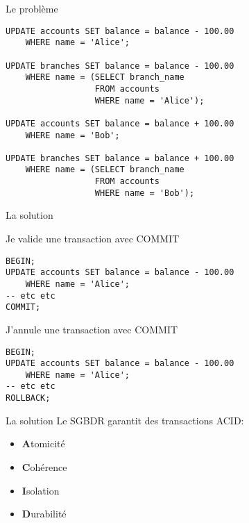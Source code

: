 \documentclass[xetex,dvipsnames]{beamer}
\begin{document}
\begin{frame}[fragile]{Le problème}
	\begin{verbatim}
UPDATE accounts SET balance = balance - 100.00
    WHERE name = 'Alice';
    
UPDATE branches SET balance = balance - 100.00
    WHERE name = (SELECT branch_name 
                  FROM accounts 
                  WHERE name = 'Alice');
                 
UPDATE accounts SET balance = balance + 100.00
    WHERE name = 'Bob';
    
UPDATE branches SET balance = balance + 100.00
    WHERE name = (SELECT branch_name 
                  FROM accounts 
                  WHERE name = 'Bob');
    \end{verbatim}
\end{frame}

\begin{frame}[fragile]{La solution}
\begin{block}{Je valide une transaction avec COMMIT}
	\begin{verbatim}
BEGIN;
UPDATE accounts SET balance = balance - 100.00
    WHERE name = 'Alice';
-- etc etc
COMMIT; 
    \end{verbatim}
\end{block}
\begin{alertblock}{J'annule une transaction avec COMMIT}
	\begin{verbatim}
BEGIN;
UPDATE accounts SET balance = balance - 100.00
    WHERE name = 'Alice';
-- etc etc
ROLLBACK; 
    \end{verbatim}    
\end{alertblock}    
    
\end{frame}

\begin{frame}[fragile]{La solution}
    Le SGBDR garantit des transactions ACID:
	\begin{itemize}
		\item \textbf{A}tomicité
		\item \textbf{C}ohérence
		\item \textbf{I}solation
		\item \textbf{D}urabilité
	\end{itemize}
    
\end{frame}
\end{document}
